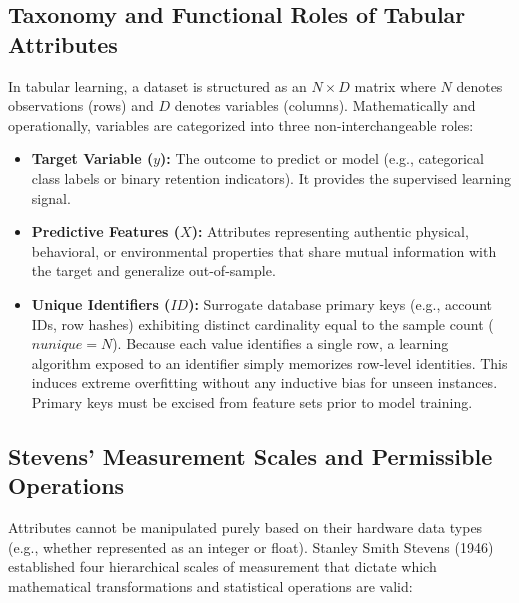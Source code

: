 \documentclass[11pt,a4paper]{article}
\begin{document}
\subsection*{Taxonomy and Functional Roles of Tabular Attributes}
In tabular learning, a dataset is structured as an $N \times D$ matrix where $N$ denotes observations (rows) and $D$ denotes variables (columns). Mathematically and operationally, variables are categorized into three non-interchangeable roles:
\begin{itemize}[leftmargin=*]
    \item \textbf{Target Variable ($y$):} The outcome to predict or model (e.g., categorical class labels or binary retention indicators). It provides the supervised learning signal.
    \item \textbf{Predictive Features ($X$):} Attributes representing authentic physical, behavioral, or environmental properties that share mutual information with the target and generalize out-of-sample.
    \item \textbf{Unique Identifiers ($ID$):} Surrogate database primary keys (e.g., account IDs, row hashes) exhibiting distinct cardinality equal to the sample count ($nunique = N$). Because each value identifies a single row, a learning algorithm exposed to an identifier simply memorizes row-level identities. This induces extreme overfitting without any inductive bias for unseen instances. Primary keys must be excised from feature sets prior to model training.
\end{itemize}

\subsection*{Stevens' Measurement Scales and Permissible Operations}
Attributes cannot be manipulated purely based on their hardware data types (e.g., whether represented as an integer or float). Stanley Smith Stevens (1946) established four hierarchical scales of measurement that dictate which mathematical transformations and statistical operations are valid:
\end{document}
